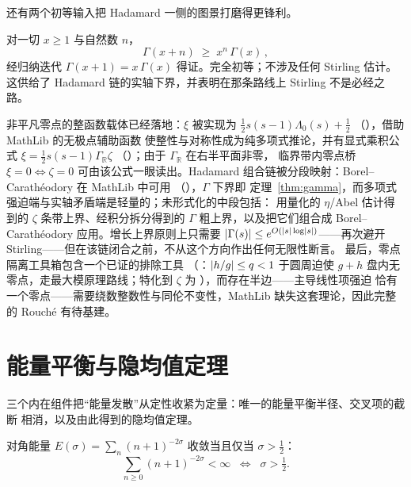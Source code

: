 还有两个初等输入把 Hadamard 一侧的图景打磨得更锋利。

\begin{theorem}\label{thm:gamma}
对一切 $x\geq 1$ 与自然数 $n$，
\[
  \Gamma(x+n) \;\geq\; x^{n}\,\Gamma(x)\, ,
\]
经归纳迭代 $\Gamma(x+1)=x\,\Gamma(x)$ 得证。完全初等；不涉及任何
Stirling 估计。这供给了 Hadamard 链的实轴下界，并表明在那条路线上
Stirling 不是必经之路。
\end{theorem}

\begin{remark}
\label{remark:xientire}
非平凡零点的整函数载体已经落地：$\xi$ 被实现为 $\tfrac12 s(s-1)\Lambda_{0}(s)+\tfrac12$
（），借助 MathLib 的无极点辅助函数 
使整性与对称性成为纯多项式推论，并有显式乘积公式
$\xi=\tfrac12 s(s-1)\Gamma_{\mathbb{R}}\zeta$
（）；由于 $\Gamma_{\mathbb{R}}$ 在右半平面非零，
临界带内零点桥 $\xi=0\Longleftrightarrow\zeta=0$ 可由该公式一眼读出。Hadamard
组合链被分段映射：Borel--Carath\'eodory 在 MathLib 中可用
（），$\Gamma$ 下界即
定理~\ref{thm:gamma}，而多项式强迫端与实轴矛盾端是轻量的；未形式化的中段包括：
用量化的 $\eta$/Abel 估计得到的 $\zeta$ 条带上界、经积分拆分得到的 $\Gamma$
粗上界，以及把它们组合成 Borel--Carath\'eodory 应用。增长上界原则上只需要
$\lvert \Gamma(s)\rvert\leq e^{O(\lvert s\rvert\log\lvert s\rvert)}$——再次避开
Stirling——但在该链闭合之前，不从这个方向作出任何无限性断言。
最后，零点隔离工具箱包含一个已证的排除工具
（：$\lvert h/g\rvert\leq q<1$ 于圆周迫使
$g+h$ 盘内无零点，走最大模原理路线；特化到 $\zeta$
为 ），而存在半边——主导线性项强迫
恰有一个零点——需要绕数整数性与同伦不变性，MathLib 缺失这套理论，因此完整的
Rouch\'e 有待基建。
\end{remark}

\section{能量平衡与隐均值定理}\label{sec:balance}

三个内在组件把“能量发散”从定性收紧为定量：唯一的能量平衡半径、交叉项的截断
相消，以及由此得到的隐均值定理。

\begin{theorem}
\label{thm:balance}
对角能量 $E(\sigma)=\sum_n (n+1)^{-2\sigma}$ 收敛当且仅当 $\sigma>\tfrac12$：
\[
  \sum_{n\geq 0} (n+1)^{-2\sigma} < \infty \;\;\Longleftrightarrow\;\; \sigma > \tfrac12 .
\]
\end{theorem}

